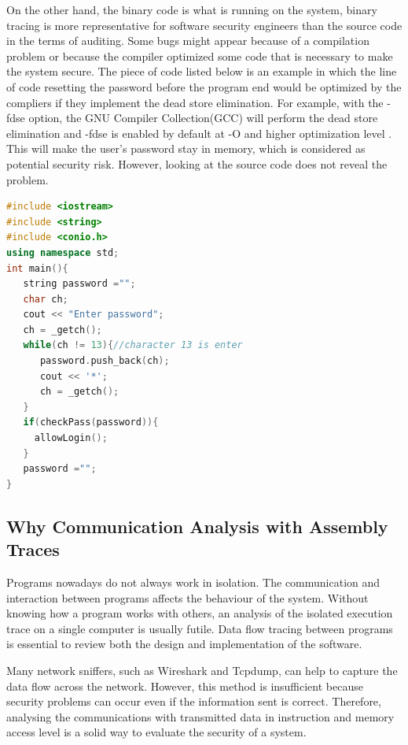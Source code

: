 On the other hand, the binary code is what is running on the system, binary tracing is more representative for software security engineers than the source code in the terms of auditing. Some bugs might appear because of a compilation problem or because the compiler optimized some code that is necessary to make the system secure. The piece of code listed below is an example in which the line of code resetting the password before the program end would be optimized by the compliers if they implement the dead store elimination\cite{howard2003writing}. For example, with the -fdse option, the GNU Compiler Collection(GCC) will perform the dead store elimination and -fdse is enabled by default at -O and higher optimization level \cite{gcc}. This will make the user's password stay in memory, which is considered as potential security risk. However, looking at the source code does not reveal the problem.

\begin{lstlisting}[language=C++, caption= Password Fetching Example ]
#include <iostream>
#include <string>
#include <conio.h>
using namespace std;
int main(){
   string password ="";
   char ch;
   cout << "Enter password";
   ch = _getch();
   while(ch != 13){//character 13 is enter
      password.push_back(ch);
      cout << '*';
      ch = _getch();
   }   
   if(checkPass(password)){
     allowLogin();
   }  
   password ="";
}
\end{lstlisting}

\subsection{Why Communication Analysis with Assembly Traces}
Programs nowadays do not always work in isolation. The communication and interaction between programs affects the behaviour of the system. Without knowing how a program works with others, an analysis of the isolated execution trace on a single computer is usually futile. Data flow tracing between programs is essential to review both the design and implementation of the software.

Many network sniffers, such as Wireshark\cite{_wireshark_????} and Tcpdump\cite{tcpdump_tcpdump/libpcap_????}, can help to capture the data flow across the network. However, this method  is insufficient because security problems can occur even if the information sent is correct. Therefore, analysing the communications with transmitted data in instruction and memory access level is a solid way to evaluate the security of a system.

